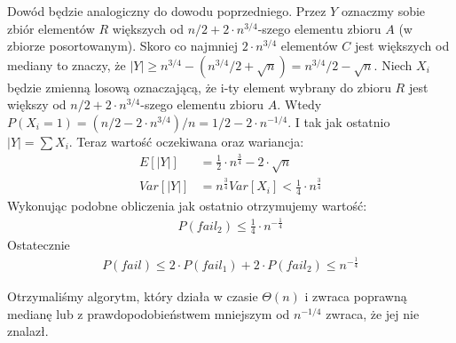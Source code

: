 Dowód będzie analogiczny do dowodu poprzedniego.
Przez $Y$ oznaczmy sobie zbiór elementów $R$ większych od $n/2 + 2\cdot n^{3/4}$-szego elementu zbioru $A$ (w zbiorze posortowanym).
Skoro co najmniej $2 \cdot n^{3/4}$ elementów $C$ jest większych od mediany to znaczy, że $|Y| \geq n^{3/4} - (n^{3/4}/2 + \sqrt{n}) = n^{3/4}/2 - \sqrt{n}$.
Niech $X_i$ będzie zmienną losową oznaczającą, że i-ty element wybrany do zbioru $R$ jest większy od $n/2 + 2\cdot n^{3/4}$-szego elementu zbioru $A$.
Wtedy $P(X_i = 1) = (n/2 - 2 \cdot n^{3/4}) / n = 1/2 - 2 \cdot n^{-1/4}$.
I tak jak ostatnio  $|Y| = \sum X_i$.
Teraz wartość oczekiwana oraz wariancja:
\begin{align*}
 E[|Y|] & = \frac{1}{2} \cdot n^{\frac{3}{4}} - 2 \cdot \sqrt{n} \\
 Var[|Y|] & = n^{\frac{3}{4}} Var[X_i] < \frac{1}{4} \cdot n^{\frac{3}{4}}
\end{align*}
Wykonując podobne obliczenia jak ostatnio otrzymujemy wartość:
\begin{align*}
 P\left(fail_2\right) \leq \frac{1}{4} \cdot n^{-\frac{1}{4}}
\end{align*}
Ostatecznie
\begin{align*}
 P\left(fail\right) \leq 2 \cdot P\left(fail_1\right) + 2 \cdot P\left(fail_2\right) \leq n^{-\frac{1}{4}}
\end{align*}

Otrzymaliśmy algorytm, który działa w czasie $\Theta(n)$ i zwraca poprawną medianę lub z prawdopodobieństwem mniejszym od $n^{-1/4}$ zwraca, że jej nie znalazł.
